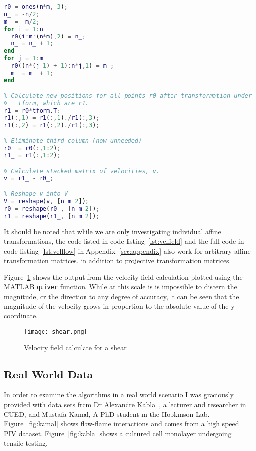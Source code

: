 \singlespacing
\begin{lstlisting}[language=MATLAB,caption={MATLAB code to calculate the velocity field of a transformation matrix},label=lst:velfield]
% Set up matrix of points r0.
r0 = ones(n*m, 3);
n_ = -n/2;
m_ = -m/2;
for i = 1:n
  r0(i:m:(n*m),2) = n_;
  n_ = n_ + 1;
end
for j = 1:m
  r0((n*(j-1) + 1):n*j,1) = m_;
  m_ = m_ + 1;
end

% Calculate new positions for all points r0 after transformation under
%   tform, which are r1.
r1 = r0*tform.T;
r1(:,1) = r1(:,1)./r1(:,3);
r1(:,2) = r1(:,2)./r1(:,3);

% Eliminate third column (now unneeded)
r0_ = r0(:,1:2);
r1_ = r1(:,1:2);

% Calculate stacked matrix of velocities, v.
v = r1_ - r0_;

% Reshape v into V
V = reshape(v, [n m 2]);
r0 = reshape(r0_, [n m 2]);
r1 = reshape(r1_, [n m 2]);
\end{lstlisting}
\onehalfspacing

It should be noted that while we are only investigating individual affine transformations, the code listed in code listing~\ref{lst:velfield} and the full code in code listing~\ref{lst:velflow} in Appendix~\ref{sec:appendix} also work for arbitrary affine transformation matrices, in addition to projective transformation matrices.

Figure~\ref{fig:shearfield} shows the output from the velocity field calculation plotted using the MATLAB \verb|quiver| function. While at this scale is is impossible to discern the magnitude, or the direction to any degree of accuracy, it can be seen that the magnitude of the velocity grows in proportion to the absolute value of the y-coordinate. 

\begin{figure}[h]
  \centering
  \texttt{[image: shear.png]}
  \caption{Velocity field calculate for a shear}
  \label{fig:shearfield}
\end{figure}

\subsection{Real World Data}

In order to examine the algorithms in a real world scenario I was graciously provided with data sets from Dr Alexandre Kabla~\cite{harris2012characterizing}, a lecturer and researcher in CUED, and Mustafa Kamal, A PhD student in the Hopkinson Lab. Figure~\ref{fig:kamal} shows flow-flame interactions and comes from a high speed PIV dataset. Figure~\ref{fig:kabla} shows a cultured cell monolayer undergoing tensile testing.


